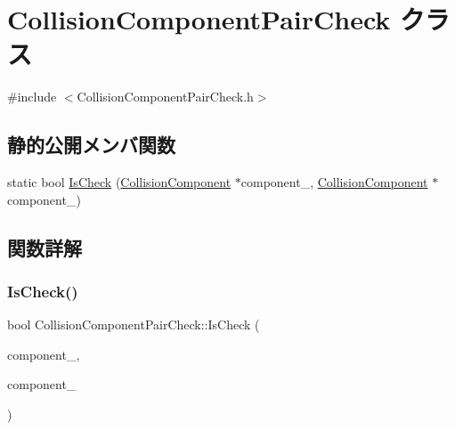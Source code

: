 \hypertarget{class_collision_component_pair_check}{}\section{Collision\+Component\+Pair\+Check クラス}
\label{class_collision_component_pair_check}


{\ttfamily \#include $<$Collision\+Component\+Pair\+Check.\+h$>$}

\subsection*{静的公開メンバ関数}
\begin{DoxyCompactItemize}
\item 
static bool \mbox{\hyperlink{class_collision_component_pair_check_a654eb93153f5be3af349cbbc27a68620}{Is\+Check}} (\mbox{\hyperlink{class_collision_component}{Collision\+Component}} $\ast$component\+\_, \mbox{\hyperlink{class_collision_component}{Collision\+Component}} $\ast$component\+\_)
\end{DoxyCompactItemize}


\subsection{関数詳解}
\mbox{\label{class_collision_component_pair_check_a654eb93153f5be3af349cbbc27a68620}} 
\subsubsection{\texorpdfstring{Is\+Check()}{IsCheck()}}
{\footnotesize\ttfamily bool Collision\+Component\+Pair\+Check\+::\+Is\+Check (\begin{DoxyParamCaption}\item[{\mbox{\hyperlink{class_collision_component}{Collision\+Component}} $\ast$}]{component\+\_,  }\item[{\mbox{\hyperlink{class_collision_component}{Collision\+Component}} $\ast$}]{component\+\_ }\end{DoxyParamCaption})\hspace{0.3cm}{\ttfamily [static]}}



